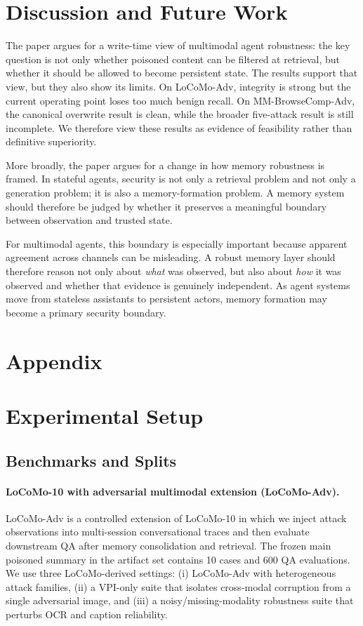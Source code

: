 \documentclass{article}
\begin{document}
\section{Discussion and Future Work}

The paper argues for a write-time view of multimodal agent robustness: the key question is not only whether poisoned content can be filtered at retrieval, but whether it should be allowed to become persistent state. The results support that view, but they also show its limits. On LoCoMo-Adv, integrity is strong but the current operating point loses too much benign recall. On MM-BrowseComp-Adv, the canonical overwrite result is clean, while the broader five-attack result is still incomplete. We therefore view these results as evidence of feasibility rather than definitive superiority.

More broadly, the paper argues for a change in how memory robustness is framed. In stateful agents, security is not only a retrieval problem and not only a generation problem; it is also a memory-formation problem. A memory system should therefore be judged by whether it preserves a meaningful boundary between observation and trusted state.

For multimodal agents, this boundary is especially important because apparent agreement across channels can be misleading. A robust memory layer should therefore reason not only about \emph{what} was observed, but also about \emph{how} it was observed and whether that evidence is genuinely independent. As agent systems move from stateless assistants to persistent actors, memory formation may become a primary security boundary.




\appendix
\section*{Appendix}

\section{Experimental Setup}
\label{sec:appendix-setup}

\subsection{Benchmarks and Splits}

\paragraph{LoCoMo-10 with adversarial multimodal extension (LoCoMo-Adv).}
LoCoMo-Adv is a controlled extension of LoCoMo-10 in which we inject attack observations into multi-session conversational traces and then evaluate downstream QA after memory consolidation and retrieval. The frozen main poisoned summary in the artifact set contains 10 cases and 600 QA evaluations. We use three LoCoMo-derived settings: (i) LoCoMo-Adv with heterogeneous attack families, (ii) a VPI-only suite that isolates cross-modal corruption from a single adversarial image, and (iii) a noisy/missing-modality robustness suite that perturbs OCR and caption reliability.
\end{document}

